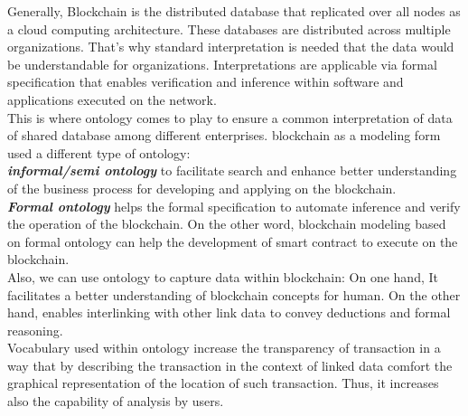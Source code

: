 Generally, Blockchain is the distributed database that replicated over all nodes as a cloud computing architecture. These databases are distributed across multiple organizations. That's why standard interpretation is needed that the data would be understandable for organizations. Interpretations are applicable via formal specification that enables verification and inference within software and applications executed on the network. \\
This is where ontology comes to play to ensure a common interpretation of data of shared database among different enterprises.
blockchain as a modeling form used a different type of ontology: \\
\textbf{\textit{informal/semi ontology}} to facilitate search and enhance better understanding of the business process for developing and applying on the blockchain.\\
\textbf{\textit{Formal ontology}} helps the formal specification to automate inference and  verify the operation of the blockchain. On the other word, blockchain modeling based on formal ontology can help the development of smart contract to execute on the blockchain.\\
Also, we can use ontology to capture data within blockchain: On one hand, It facilitates a better understanding of blockchain concepts for human. On the other hand, enables interlinking with other link data to convey deductions and formal reasoning\cite{Matthew}.\\
Vocabulary used within ontology increase the transparency of transaction in a way that by describing the transaction in the context of linked data comfort the graphical representation of the location of such transaction. Thus, it increases also the capability of analysis by users.

